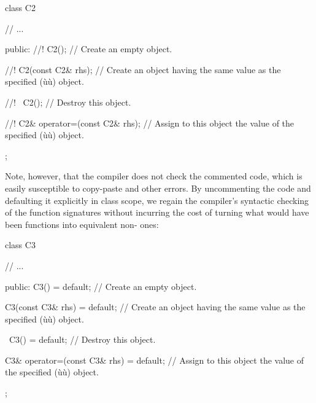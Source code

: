 \begin{emcppslisting}
class C2
{
     // ...

public:
   //! C2();
       // Create an empty object.

   //! C2(const C2& rhs);
       // Create an object having the same value as the specified (ù{}ù) object.

   //! ~C2();
       // Destroy this object.

   //! C2& operator=(const C2& rhs);
       // Assign to this object the value of the specified (ù{}ù) object.
};
\end{emcppslisting}

\noindent Note, however, that the compiler does not check the commented code, which is easily susceptible to copy-paste and other errors. By
uncommenting the code and defaulting it explicitly in class scope, we
regain the compiler's syntactic checking of the function signatures
without incurring the cost of turning what would have been
 functions into equivalent
non- ones:

\begin{emcppslisting}
class C3
{
     // ...

public:
   C3() = default;
       // Create an empty object.

   C3(const C3& rhs) = default;
       // Create an object having the same value as the specified (ù{}ù) object.

   ~C3() = default;
       // Destroy this object.

   C3& operator=(const C3& rhs) = default;
       // Assign to this object the value of the specified (ù{}ù) object.
};
\end{emcppslisting}



